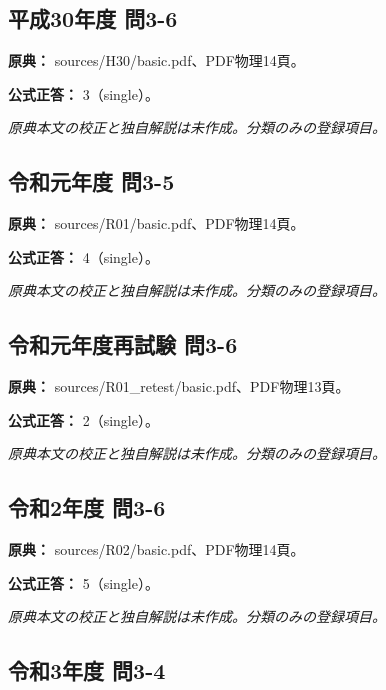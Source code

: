 \subsection{平成30年度 問3-6}
\label{q:h30-reg-basic-3-6}

\noindent\textbf{原典：} sources/H30/basic.pdf、PDF物理14頁。

\textbf{公式正答：} 3（single）。

\par\textit{原典本文の校正と独自解説は未作成。分類のみの登録項目。}

\subsection{令和元年度 問3-5}
\label{q:r01-reg-basic-3-5}

\noindent\textbf{原典：} sources/R01/basic.pdf、PDF物理14頁。

\textbf{公式正答：} 4（single）。

\par\textit{原典本文の校正と独自解説は未作成。分類のみの登録項目。}

\subsection{令和元年度再試験 問3-6}
\label{q:r01-ret-basic-3-6}

\noindent\textbf{原典：} sources/R01\_retest/basic.pdf、PDF物理13頁。

\textbf{公式正答：} 2（single）。

\par\textit{原典本文の校正と独自解説は未作成。分類のみの登録項目。}

\subsection{令和2年度 問3-6}
\label{q:r02-reg-basic-3-6}

\noindent\textbf{原典：} sources/R02/basic.pdf、PDF物理14頁。

\textbf{公式正答：} 5（single）。

\par\textit{原典本文の校正と独自解説は未作成。分類のみの登録項目。}

\subsection{令和3年度 問3-4}
\label{q:r03-reg-basic-3-4}

